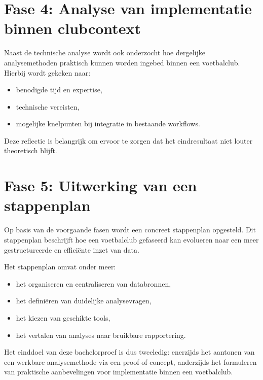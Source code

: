 \section{Fase 4: Analyse van implementatie binnen clubcontext}

Naast de technische analyse wordt ook onderzocht hoe dergelijke analysemethoden praktisch kunnen worden ingebed binnen een voetbalclub.
Hierbij wordt gekeken naar:

\begin{itemize}
    \item benodigde tijd en expertise,
    \item technische vereisten,
    \item mogelijke knelpunten bij integratie in bestaande workflows.
\end{itemize}

Deze reflectie is belangrijk om ervoor te zorgen dat het eindresultaat niet louter theoretisch blijft.

\section{Fase 5: Uitwerking van een stappenplan}

Op basis van de voorgaande fasen wordt een concreet stappenplan opgesteld.
Dit stappenplan beschrijft hoe een voetbalclub gefaseerd kan evolueren naar een meer gestructureerde en efficiënte inzet van data.

Het stappenplan omvat onder meer:

\begin{itemize}
    \item het organiseren en centraliseren van databronnen,
    \item het definiëren van duidelijke analysevragen,
    \item het kiezen van geschikte tools,
    \item het vertalen van analyses naar bruikbare rapportering.
\end{itemize}

Het einddoel van deze bachelorproef is dus tweeledig: enerzijds het aantonen van een werkbare analysemethode via een proof-of-concept, anderzijds het formuleren van praktische aanbevelingen voor implementatie binnen een voetbalclub.